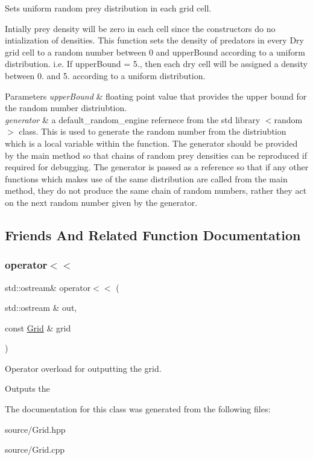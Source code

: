 Sets uniform random prey distribution in each grid cell.

Intially prey density will be zero in each cell since the constructors do no intialization of densities. This function sets the density of predators in every Dry grid cell to a random number between 0 and upper\+Bound according to a uniform distribution. i.\+e. If upper\+Bound = 5., then each dry cell will be assigned a density between 0. and 5. according to a uniform distribution.


\begin{DoxyParams}{Parameters}
{\em upper\+Bound} & floating point value that provides the upper bound for the random number distriubtion.\\
\hline
{\em generator} & a default\+\_\+random\+\_\+engine refernece from the std library $<$random$>$ class. This is used to generate the random number from the distriubtion which is a local variable within the function. The generator should be provided by the main method so that chains of random prey densities can be reproduced if required for debugging. The generator is passed as a reference so that if any other functions which makes use of the same distribution are called from the main method, they do not produce the same chain of random numbers, rather they act on the next random number given by the generator. \\
\hline
\end{DoxyParams}


\subsection{Friends And Related Function Documentation}
\mbox{\label{class_grid_a3513576c9cced69b185e4be8fe248e8c}} 
\subsubsection{\texorpdfstring{operator$<$$<$}{operator<<}}
{\footnotesize\ttfamily std\+::ostream\& operator$<$$<$ (\begin{DoxyParamCaption}\item[{std\+::ostream \&}]{out,  }\item[{const \hyperlink{class_grid}{Grid} \&}]{grid }\end{DoxyParamCaption})\hspace{0.3cm}{\ttfamily [friend]}}



Operator overload for outputting the grid. 

Outputs the 

The documentation for this class was generated from the following files\+:\begin{DoxyCompactItemize}
\item 
source/Grid.\+hpp\item 
source/Grid.\+cpp\end{DoxyCompactItemize}
